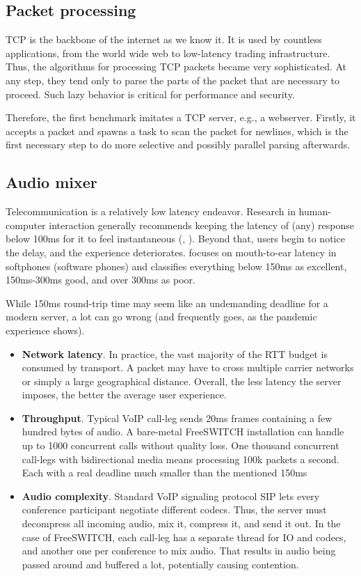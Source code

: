 \documentclass[12pt,a4paper,twoside]{report}
\begin{document}
\subsection{Packet processing}
\label{section:background_packet-processing}
TCP is the backbone of the internet as we know it. It is used by countless applications, from the world wide web to low-latency trading infrastructure. Thus, the algorithms for processing TCP packets became very sophisticated. At any step, they tend only to parse the parts of the packet that are necessary to proceed. Such lazy behavior is critical for performance and security.

Therefore, the first benchmark imitates a TCP server, e.g., a webserver. Firstly, it accepts a packet and spawns a task to scan the packet for newlines, which is the first necessary step to do more selective and possibly parallel parsing afterwards. 

\subsection{Audio mixer}
\label{section:bench-audio-mixer}
Telecommunication is a relatively low latency endeavor. Research in human-computer interaction generally recommends keeping the latency of (any) response below 100ms for it to feel instantaneous (\cite{Miller1968}, \cite{Amin2013}). Beyond that, users begin to notice the delay, and the experience deteriorates. \cite{voip-latency} focuses on mouth-to-ear latency in softphones (software phones) and classifies everything below 150ms as excellent, 150ms-300ms good, and over 300ms as poor. 

While 150ms round-trip time may seem like an undemanding deadline for a modern server, a lot can go wrong (and frequently goes, as the pandemic experience shows).  
\begin{itemize}
    \item \textbf{Network latency}. In practice, the vast majority of the RTT budget is consumed by transport. A packet may have to cross multiple carrier networks or simply a large geographical distance. Overall, the less latency the server imposes, the better the average user experience. 
    \item \textbf{Throughput}. Typical VoIP call-leg sends 20ms frames containing a few hundred bytes of audio. A bare-metal FreeSWITCH \cite{Maruzzelli2017-ou} installation can handle up to 1000 concurrent calls without quality loss. One thousand concurrent call-legs with bidirectional media means processing 100k packets a second. Each with a real deadline much smaller than the mentioned 150ms
    \item \textbf{Audio complexity}. Standard VoIP signaling protocol SIP lets every conference participant negotiate different codecs. Thus, the server must decompress all incoming audio, mix it, compress it, and send it out. In the case of FreeSWITCH, each call-leg has a separate thread for IO and codecs, and another one per conference to mix audio. That results in audio being passed around and buffered a lot, potentially causing contention.      
\end{itemize}
\end{document}
